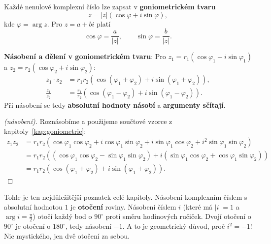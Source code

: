 \begin{definitionbox}
  Každé nenulové komplexní číslo lze zapsat v \textbf{goniometrickém tvaru}
  \begin{equation*}
    z = |z|(\cos\varphi + i\sin\varphi),
  \end{equation*}
  kde $\varphi = \arg z$. Pro $z = a + bi$ platí
  \begin{equation*}
    \cos\varphi = \frac{a}{|z|},\qquad\sin\varphi = \frac{b}{|z|}.
  \end{equation*}

  \textbf{Násobení a dělení v goniometrickém tvaru}: Pro $z_1 = r_1(\cos\varphi_1 + i\sin\varphi_1)$ a $z_2 = r_2(\cos\varphi_2 + i\sin\varphi_2)$:
  \begin{align*}
    z_1\cdot z_2 &= r_1r_2\left(\cos(\varphi_1 + \varphi_2) + i\sin(\varphi_1 + \varphi_2)\right),\\
    \frac{z_1}{z_2} &= \frac{r_1}{r_2}\left(\cos(\varphi_1 - \varphi_2) + i\sin(\varphi_1 - \varphi_2)\right).
  \end{align*}
  Při násobení se tedy \textbf{absolutní hodnoty násobí} a \textbf{argumenty sčítají}.
\end{definitionbox}

\begin{proof}[(násobení)]
  Roznásobíme a použijeme součtové vzorce z kapitoly~\ref{kap:goniometrie}:
  \begin{align*}
    z_1z_2 &= r_1r_2\left(\cos\varphi_1\cos\varphi_2 + i\cos\varphi_1\sin\varphi_2 + i\sin\varphi_1\cos\varphi_2 + i^2\sin\varphi_1\sin\varphi_2\right)\\
    &= r_1r_2\left((\cos\varphi_1\cos\varphi_2 - \sin\varphi_1\sin\varphi_2) + i(\sin\varphi_1\cos\varphi_2 + \cos\varphi_1\sin\varphi_2)\right)\\
    &= r_1r_2\left(\cos(\varphi_1 + \varphi_2) + i\sin(\varphi_1 + \varphi_2)\right).
  \end{align*}
\end{proof}

Tohle je ten nejdůležitější poznatek celé kapitoly. Násobení komplexním číslem s absolutní hodnotou $1$ je \textbf{otočení} roviny. Násobení číslem $i$ (které má $|i| = 1$ a $\arg i = \frac{\pi}{2}$) otočí každý bod o $90^\circ$ proti směru hodinových ručiček. Dvojí otočení o $90^\circ$ je otočení o $180^\circ$, tedy násobení $-1$. A to je geometrický důvod, proč $i^2 = -1$! Nic mystického, jen dvě otočení za sebou.

